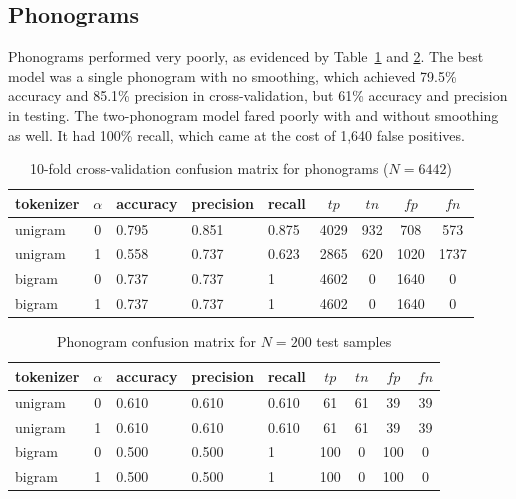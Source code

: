 \documentclass[10pt]{article}
\def \corpusSize {6442}
\def \testSize {200}
\begin{document}
\subsection{Phonograms}

Phonograms performed very poorly, as evidenced by Table~\ref{table:phono-cv}
and \ref{table:phono-t}. The best model was a single phonogram with no
smoothing, which achieved 79.5\% accuracy and 85.1\% precision in
cross-validation, but 61\% accuracy and precision in testing. The
two-phonogram model fared poorly with and without smoothing as well. It had
100\% recall, which came at the cost of 1,640 false positives.


\begin{table}[b]
  \centering
  \caption{10-fold cross-validation confusion matrix for phonograms ($N=\corpusSize$)}
  \label{table:phono-cv}
  \begin{tabular}{lclllcccc}
    \toprule
    tokenizer & $\alpha$ & accuracy & precision & recall & $tp$ & $tn$ & $fp$ & $fn$ \\ \midrule
    unigram & 0 & 0.795 & 0.851 & 0.875 & 4029 & 932 & 708 & 573 \\
    unigram & 1 & 0.558 & 0.737 & 0.623 & 2865 & 620 & 1020 & 1737 \\
    bigram & 0 & 0.737 & 0.737 & 1 & 4602 & 0 & 1640 & 0 \\
    bigram & 1 & 0.737 & 0.737 & 1 & 4602 & 0 & 1640 & 0 \\
    \bottomrule
  \end{tabular}
\end{table}

\begin{table}[b]
  \centering
  \caption{Phonogram confusion matrix for $N=\testSize$ test samples}
  \label{table:phono-t}
  \begin{tabular}{lclllcccc}
    \toprule
    tokenizer & $\alpha$ & accuracy & precision & recall & $tp$ & $tn$ & $fp$ & $fn$ \\ \midrule
    unigram& 0 & 0.610 & 0.610 & 0.610 & 61 & 61 & 39 & 39 \\
    unigram& 1 & 0.610 & 0.610 & 0.610 & 61 & 61 & 39 & 39 \\
    bigram& 0 & 0.500 & 0.500 & 1 & 100 & 0 & 100 & 0 \\
    bigram & 1 & 0.500 & 0.500 & 1 & 100 & 0 & 100 & 0 \\

    \bottomrule
  \end{tabular}
\end{table}
\end{document}

